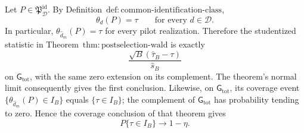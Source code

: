 Let \(P\in\mathfrak P_{\mathcal D}^{\mathrm{id}}\).  By Definition~\(\mathrm{def{:}common\text{-}identification\text{-}class}\),
\[
 \theta_d(P)=\tau\qquad\text{for every }d\in\mathcal D.
\]
In particular, \(\theta_{\widehat d_m}(P)=\tau\) for every pilot realization.  Therefore the studentized statistic in Theorem~\(\mathrm{thm{:}postselection\text{-}wald}\) is exactly
\[
 \frac{\sqrt B(\widehat\tau_B-\tau)}{\widehat s_B}
\]
on \(\mathsf G_{\mathrm{tot}}\), with the same zero extension on its complement.  The theorem's normal limit consequently gives the first conclusion.  Likewise, on \(\mathsf G_{\mathrm{tot}}\), its coverage event \(\{\theta_{\widehat d_m}(P)\in I_B\}\) equals \(\{\tau\in I_B\}\); the complement of \(\mathsf G_{\mathrm{tot}}\) has probability tending to zero.  Hence the coverage conclusion of that theorem gives
\[
 P\{\tau\in I_B\}\longrightarrow1-\eta.
\]